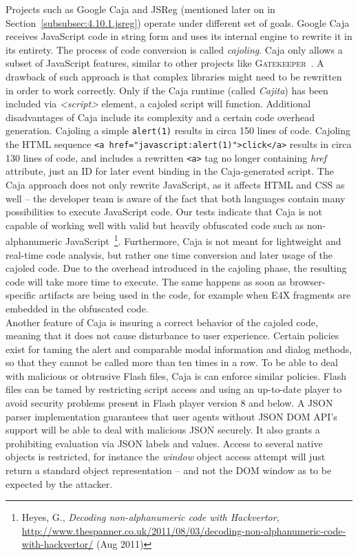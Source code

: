      Projects such as Google Caja and JSReg (mentioned later on in Section~\ref{subsubsec:4.10.1.jsreg}) operate under different set of goals. Google Caja receives JavaScript code in string form and uses its internal engine to rewrite it in its entirety. The process of code conversion is called \textit{cajoling}. Caja only allows a subset of JavaScript features, similar to other projects like \textsc{Gatekeeper}~\cite{Guarnieri:2009:GMS}. A drawback of such approach is that complex libraries might need to be rewritten in order to work correctly. Only if the Caja runtime (called \textit{Cajita}) has been included via \textit{<script>} element, a cajoled script will function. Additional disadvantages of Caja include its complexity and a certain code overhead generation. Cajoling a simple \texttt{alert(1)} results in circa 150 lines of code. Cajoling the HTML sequence \texttt{<a href="javascript:alert(1)">click</a>} results in circa 130 lines of code, and includes a rewritten \verb|<a>| tag no longer containing 
\textit{href} attribute, just an ID for later event binding in the Caja-generated script. The Caja approach does not only rewrite JavaScript, as it affects HTML and CSS as well -- the developer team is aware of the fact that both languages contain many possibilities to execute JavaScript code. Our tests indicate that Caja is not capable of working well with valid but heavily obfuscated code such as non-alphanumeric JavaScript~\footnote{Heyes, G., \textit{Decoding non-alphanumeric code with Hackvertor}, \url{http://www.thespanner.co.uk/2011/08/03/decoding-non-alphanumeric-code-with-hackvertor/} (Aug 2011)}. Furthermore, Caja is not meant for lightweight and real-time code analysis, but rather one time conversion and later usage of the cajoled code. Due to the overhead introduced in the cajoling phase, the resulting code will take more time to execute. The same happens as soon as browser-specific artifacts are being used in the code, for example when E4X fragments are embedded in the obfuscated code. \\

    Another feature of Caja is insuring a correct behavior of the cajoled code, meaning that it does not cause disturbance to user experience. Certain policies exist for taming the alert and comparable modal information and dialog methods, so that they cannot be called more than ten times in a row. To be able to deal with malicious or obtrusive Flash files, Caja is can enforce similar policies. Flash files can be tamed by restricting script access and using an up-to-date player to avoid security problems present in Flash player version 8 and below. A JSON parser implementation guarantees that user agents without JSON DOM API's support will be able to deal with malicious JSON securely. It also grants a prohibiting evaluation via JSON labels and values. Access to several native objects is restricted, for instance the \textit{window} object access attempt will just return a standard object representation -- and not the DOM window as to be expected by the attacker.

